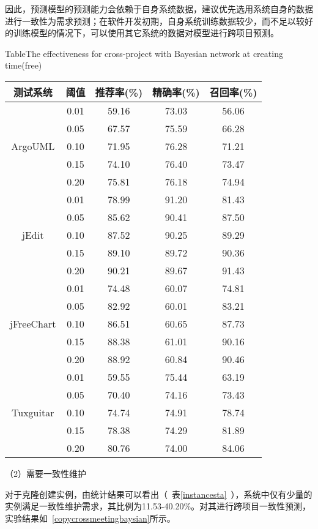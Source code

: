 因此，预测模型的预测能力会依赖于自身系统数据，建议优先选用系统自身的数据进行一致性为需求预测；在软件开发初期，自身系统训练数据较少，而不足以较好的训练模型的情况下，可以使用其它系统的数据对模型进行跨项目预测。

\begin{table}[htbp]
{Table$\!$}{The effectiveness for cross-project with Bayesian network at creating time(free)}
\vspace{0.5em}
\centering
\wuhao
\begin{tabular}{ccccc}
\toprule[1.5pt]
{测试系统}&{阈值}&{推荐率(\%)}&{精确率(\%)}&{召回率(\%)}\\
\midrule[1pt]
\multirow{5}{*}{ArgoUML}
&0.01&	59.16&	73.03&	56.06\\
&0.05&	67.57&	75.59&	66.28\\
&0.10&	71.95&	76.28&	71.21\\
&0.15&	74.10&	76.40&	73.47\\
&0.20&	75.81&	76.18&	74.94\\
\hline
\multirow{5}{*}{jEdit}
&0.01&	78.99&	91.20&	81.43\\
&0.05&	85.62&	90.41&	87.50\\
&0.10&	87.52&	90.25&	89.29\\
&0.15&	89.10&	89.72&	90.36\\
&0.20&	90.21&	89.67&	91.43\\
\hline
\multirow{5}{*}{jFreeChart}
&0.01&	74.48&	60.07&	74.81\\
&0.05&	82.92&	60.01&	83.21\\
&0.10&	86.51&	60.65&	87.73\\
&0.15&	88.38&	61.01&	90.16\\
&0.20&	88.92&	60.84&	90.46\\
\hline
\multirow{5}{*}{Tuxguitar}
&0.01&	59.55&	75.44&	63.19\\
&0.05&	70.40&	74.16&	73.43\\
&0.10&	74.74&	74.91&	78.74\\
&0.15&	78.38&	74.29&	81.89\\
&0.20&	80.76&	74.00&	84.06\\
\bottomrule[1.5pt]
\end{tabular}
\end{table}

（2）需要一致性维护

对于克隆创建实例，由统计结果可以看出（~表\ref{instancesta}~），系统中仅有少量的实例满足一致性维护需求，其比例为11.53-40.20\%。对其进行跨项目一致性预测，实验结果如~\ref{copycrossmeetingbaysian}所示。

